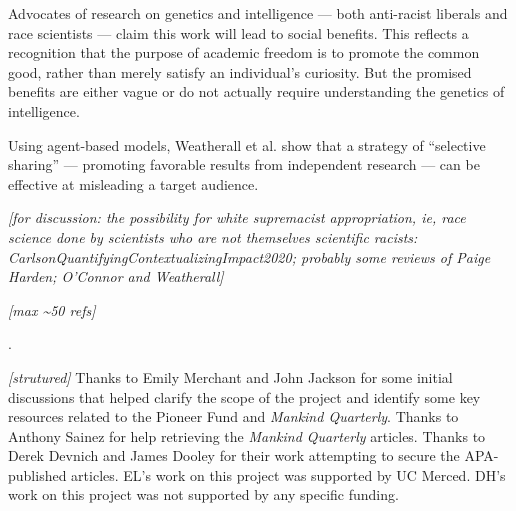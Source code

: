 \documentclass[12pt]{article}
\newcounter{lastnote}
\newenvironment{scilastnote}{%
\setcounter{lastnote}{\value{enumiv}}%
\addtocounter{lastnote}{+1}%
\begin{list}%
{\arabic{lastnote}.}
{\setlength{\leftmargin}{.22in}}
{\setlength{\labelsep}{.5em}}}
{\end{list}}
\begin{document}
Advocates of research on genetics and intelligence --- both anti-racist
liberals and race scientists --- claim this work will lead to social
benefits. This reflects a recognition that the purpose of academic
freedom is to promote the common good, rather than merely satisfy an
individual's curiosity. But the promised benefits are either vague or do
not actually require understanding the genetics of
intelligence.\cite{KaplanGaltonQuincunxProbabilistic2021, CoopLotteryLuckLegacy2022}

Using agent-based models, Weatherall et
al.\cite{WeatherallHowBeatScience2018} show that a strategy of
``selective sharing'' --- promoting favorable results from independent
research --- can be effective at misleading a target audience.

\emph{{[}for discussion: the possibility for white supremacist
appropriation, ie, race science done by scientists who are not
themselves scientific racists:
CarlsonQuantifyingContextualizingImpact2020; probably some reviews of
Paige Harden; O'Connor and Weatherall{]}}

\emph{{[}max \textasciitilde50 refs{]}}




\begin{scilastnote}
\item \emph{{[}strutured{]}} Thanks to Emily Merchant and John Jackson
for some initial discussions that helped clarify the scope of the
project and identify some key resources related to the Pioneer Fund and
\emph{Mankind Quarterly}. Thanks to Anthony Sainez for help retrieving
the \emph{Mankind Quarterly} articles. Thanks to Derek Devnich and James
Dooley for their work attempting to secure the APA-published articles.
EL's work on this project was supported by UC Merced. DH's work on this
project was not supported by any specific funding.
\end{scilastnote}


\renewcommand{\thetable}{\arabic{table}}
\renewcommand{\thefigure}{\arabic{figure}}
\setcounter{table}{0}
\setcounter{figure}{0}









\end{document}
